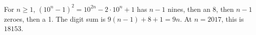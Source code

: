 For $ n\ge1 $, $(10^n-1)^2=10^{2n}-2\cdot10^n+1 $ has $ n-1 $ nines, then an 8, then $ n-1 $ zeroes, then a 1. The digit sum is $ 9(n-1)+8+1=9n $. At $ n=2017 $, this is $\boxed{18153}$.
